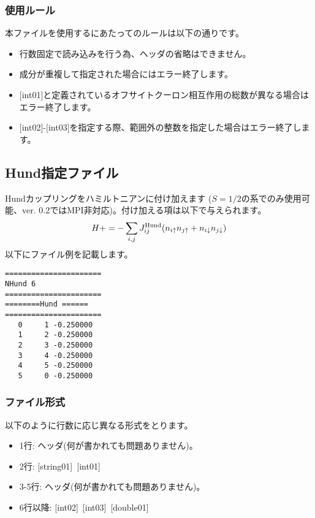 \subsubsection{使用ルール}
本ファイルを使用するにあたってのルールは以下の通りです。
\begin{itemize}
\item 行数固定で読み込みを行う為、ヘッダの省略はできません。
\item 成分が重複して指定された場合にはエラー終了します。
\item $[$int01$]$と定義されているオフサイトクーロン相互作用の総数が異なる場合はエラー終了します。
\item $[$int02$]$-$[$int03$]$を指定する際、範囲外の整数を指定した場合はエラー終了します。
\end{itemize}

\newpage
\subsection{Hund指定ファイル}
Hundカップリングをハミルトニアンに付け加えます{ ($S=1/2$の系でのみ使用可能、ver. 0.2ではMPI非対応)}。付け加える項は以下で与えられます。
\begin{equation}
H+=-\sum_{i,j}J_{ij}^{\rm Hund} (n_{i\uparrow}n_{j\uparrow}+n_{i\downarrow}n_{j\downarrow})
\end{equation}
以下にファイル例を記載します。

\begin{minipage}{12.5cm}
\begin{screen}
\begin{verbatim}
====================== 
NHund 6  
====================== 
========Hund ====== 
====================== 
   0     1 -0.250000
   1     2 -0.250000
   2     3 -0.250000
   3     4 -0.250000
   4     5 -0.250000
   5     0 -0.250000
\end{verbatim}
\end{screen}
\end{minipage}

\subsubsection{ファイル形式}
以下のように行数に応じ異なる形式をとります。
 \begin{itemize}
   \item  1行:  ヘッダ(何が書かれても問題ありません)。
   \item  2行:   [string01]~[int01]
   \item  3-5行:  ヘッダ(何が書かれても問題ありません)。
   \item  6行以降:
   [int02]~[int03]~[double01] 
  \end{itemize}
